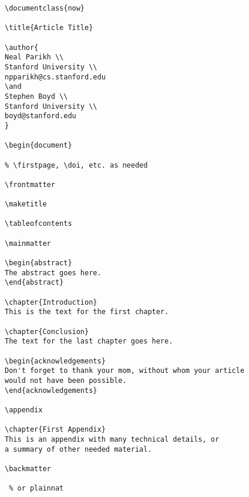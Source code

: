 \documentclass[openany]{now} %
\begin{document}
\begin{verbatim}
\documentclass{now}

\title{Article Title}

\author{
Neal Parikh \\
Stanford University \\
npparikh@cs.stanford.edu
\and
Stephen Boyd \\
Stanford University \\
boyd@stanford.edu
}

\begin{document}

% \firstpage, \doi, etc. as needed

\frontmatter

\maketitle

\tableofcontents

\mainmatter

\begin{abstract}
The abstract goes here.
\end{abstract}

\chapter{Introduction}
This is the text for the first chapter.

\chapter{Conclusion}
The text for the last chapter goes here.

\begin{acknowledgements}
Don't forget to thank your mom, without whom your article
would not have been possible.
\end{acknowledgements}

\appendix

\chapter{First Appendix}
This is an appendix with many technical details, or
a summary of other needed material.

\backmatter

 % or plainnat

\end{verbatim}
\end{document}
